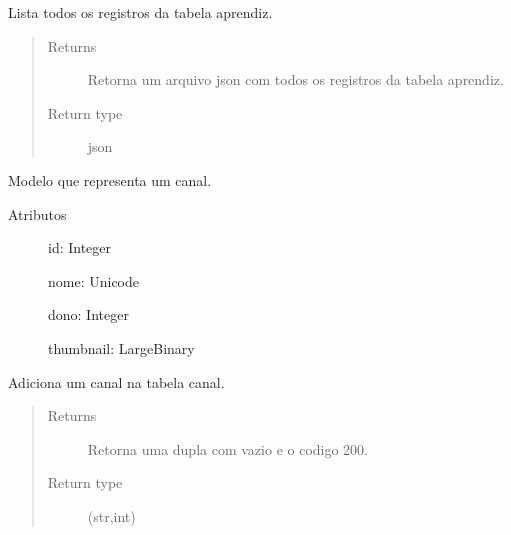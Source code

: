 \documentclass[letterpaper,10pt,english]{sphinxmanual}
\begin{document}

\begin{fulllineitems}
\label{\detokenize{index:aprendiz.list_Aprendiz}}
Lista todos os registros da tabela
aprendiz.
\begin{quote}\begin{description}
\item[{Returns}] \leavevmode
Retorna um arquivo json com todos os registros da tabela aprendiz.

\item[{Return type}] \leavevmode
json

\end{description}\end{quote}

\end{fulllineitems}

\label{\detokenize{index:module-business}}\label{\detokenize{index:module-canal}}

\begin{fulllineitems}
\label{\detokenize{index:canal.Canal}}
Modelo que representa um canal.
\begin{description}
\item[{Atributos}] \leavevmode
id: Integer

nome: Unicode

dono: Integer

thumbnail: LargeBinary

\end{description}

\end{fulllineitems}


\begin{fulllineitems}
\label{\detokenize{index:canal.add_canal}}
Adiciona um canal na tabela
canal.
\begin{quote}\begin{description}
\item[{Returns}] \leavevmode
Retorna uma dupla com vazio e o codigo 200.

\item[{Return type}] \leavevmode
(str,int)

\end{description}\end{quote}

\end{fulllineitems}
\end{document}
